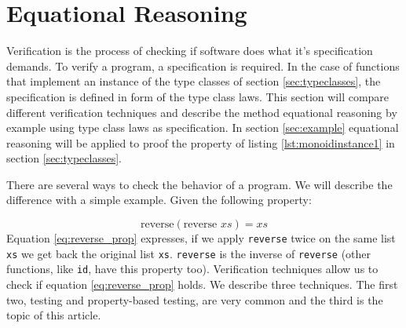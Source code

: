 \section{Equational Reasoning}
\label{sec:equationalreasoning}

Verification is the process of checking if software does what it's specification demands. To verify a program, a specification is required. In the case of functions that implement an instance of the type classes of section \ref{sec:typeclasses}, the specification is defined in form of the type class laws.
This section will compare different verification techniques and describe the method equational reasoning by example using type class laws as specification. In section \ref{sec:example} equational reasoning will be applied to proof the property of listing \ref{lst:monoidinstance1} in section \ref{sec:typeclasses}.

There are several ways to check the behavior of a program. 
We will describe the difference with a simple example. Given the following property:

\begin{equation}
  \label{eq:reverse_prop}
\text{reverse} (\text{reverse } xs) = xs  
\end{equation}
Equation \ref{eq:reverse_prop} expresses, if we apply \verb|reverse| twice on the same list \verb|xs| we get back the original list \verb|xs|. \verb|reverse| is the inverse of \verb|reverse| (other functions, like \verb|id|, have this property too). Verification techniques allow us to check if equation \ref{eq:reverse_prop} holds. We describe three techniques. The first two, testing and property-based testing, are very common and the third is the topic of this article.

